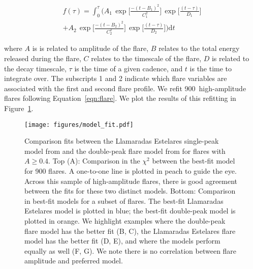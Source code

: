 \documentclass[twocolumn]{aastex631}
\begin{document}
\begin{equation}\label{eqn:flare}
\begin{split}
    f(\tau) = \int_0^\tau\bigg( A_1\, \exp\bigg[\frac{-(t-B_1)^2}{C_1^2}\bigg] \,\exp\bigg[\frac{(t-\tau)}{D_1}\bigg]\\+A_2 \,\exp\bigg[\frac{-(t-B_2)^2}{C_2^2}\bigg] \,\exp\bigg[\frac{(t-\tau)}{D_2}\bigg]\bigg) \textrm{d}t
\end{split}
\end{equation}

where $A$ is is related to amplitude of the flare, $B$ relates
to the total energy released during the flare, $C$ relates to the timescale of
the flare, $D$ is related to the decay timescale, $\tau$ is the time of a given
cadence, and $t$ is the time to integrate over. The subscripts 1 and 2 indicate
which flare variables are associated with the first and second flare profile. We
refit 900~high-amplitude flares following Equation~\ref{eqn:flare}. We plot the
results of this refitting in Figure~\ref{fig:model_fit}.

\begin{figure}[ht!]
    \begin{centering}
        \texttt{[image: figures/model\_fit.pdf]}
        \caption{
            Comparison fits between the Llamaradas Estelares
            single-peak model from \cite{tovar22} and the double-peak flare model
            from \cite{pietras22} for flares with $A \geq 0.4$. Top (A): Comparison
            in the $\chi^2$ between the best-fit model for 900 flares. A one-to-one
            line is plotted in peach to guide the eye. Across this sample of
            high-amplitude flares, there is good agreement between the fits for
            these two distinct models. Bottom: Comparison in best-fit models for
            a subset of flares. The best-fit Llamaradas Estelares model is plotted
            in blue; the best-fit double-peak model is plotted in orange. We
            highlight examples where the double-peak flare model has the better
            fit (B, C), the Llamaradas Estelares flare model has the better fit
            (D, E), and where the models perform equally as well (F, G). We note
            there is no correlation between flare amplitude and preferred model.
        }
        \label{fig:model_fit}
    \end{centering}
\end{figure}
\end{document}
